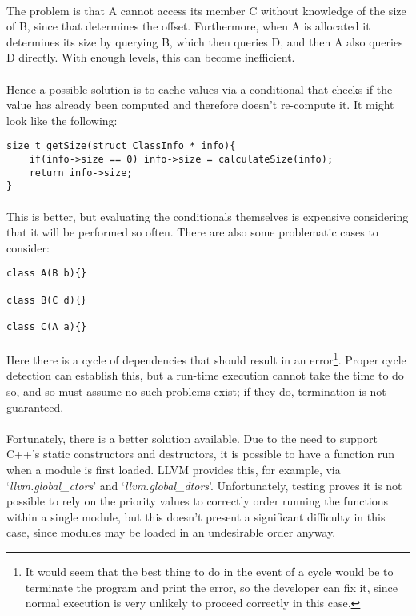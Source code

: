 \documentclass{article}
\begin{document}
\paragraph{}
The problem is that A cannot access its member C without knowledge of the size of B, since that determines the offset. Furthermore, when A is allocated it determines its size by querying B, which then queries D, and then A also queries D directly. With enough levels, this can become inefficient.

\paragraph{}
Hence a possible solution is to cache values via a conditional that checks if the value has already been computed and therefore doesn't re-compute it. It might look like the following:

\begin{lstlisting}
size_t getSize(struct ClassInfo * info){
	if(info->size == 0) info->size = calculateSize(info);
	return info->size;
}
\end{lstlisting}

\paragraph{}
This is better, but evaluating the conditionals themselves is expensive considering that it will be performed so often. There are also some problematic cases to consider:

\begin{lstlisting}
class A(B b){}

class B(C d){}

class C(A a){}
\end{lstlisting}

\paragraph{}
Here there is a cycle of dependencies that should result in an error\footnote{It would seem that the best thing to do in the event of a cycle would be to terminate the program and print the error, so the developer can fix it, since normal execution is very unlikely to proceed correctly in this case.}. Proper cycle detection can establish this, but a run-time execution cannot take the time to do so, and so must assume no such problems exist; if they do, termination is not guaranteed.

\paragraph{}
Fortunately, there is a better solution available. Due to the need to support C++'s static constructors and destructors, it is possible to have a function run when a module is first loaded. LLVM provides this, for example, via `\emph{llvm.global\_ctors}' and `\emph{llvm.global\_dtors}'. Unfortunately, testing proves it is not possible to rely on the priority values to correctly order running the functions within a single module, but this doesn't present a significant difficulty in this case, since modules may be loaded in an undesirable order anyway.
\end{document}
